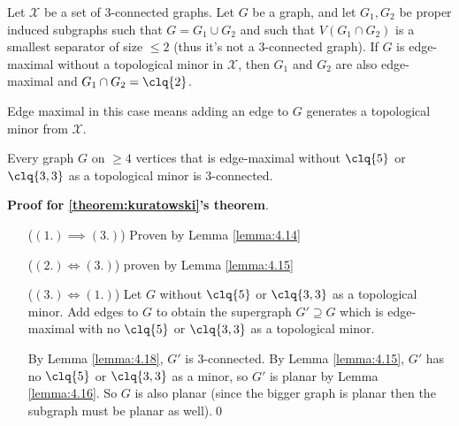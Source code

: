 \begin{customlemma}{4.17}
\label{lemma:4.17}
    Let $\mathcal{X}$ be a set of $3$-connected graphs. Let $G$ be a graph, and let $G_1, G_2$ be proper induced subgraphs such that $G = G_1 \cup G_2$ and such that $V(G_1 \cap G_2)$ is a smallest separator of size $\leq 2$ (thus it's not a $3$-connected graph). If $G$ is edge-maximal without a topological minor in $\mathcal{X}$, then $G_1$ and $G_2$ are also edge-maximal and $G_1 \cap G_2 = \clq{2}$.
\end{customlemma}
Edge maximal in this case means adding an edge to $G$ generates a topological minor from $\mathcal{X}$.
\begin{customlemma}{4.18}
\label{lemma:4.18}
    Every graph $G$ on $\geq 4$ vertices that is edge-maximal without $\clq{5}$ or $\clq{3, 3}$ as a topological minor is $3$-connected.
\end{customlemma}
\begin{prf}
    \textbf{Proof for \ref{theorem:kuratowski}'s theorem}.

    \begin{itemize}
        \item[($(1.) \implies (3.)$)] Proven by Lemma \ref{lemma:4.14}
        \item[($(2.) \iff (3.)$)] proven by Lemma \ref{lemma:4.15}
        \item[($(3.) \iff (1.)$)] Let $G$ without $\clq{5}$ or $\clq{3, 3}$ as a topological minor. Add edges to $G$ to obtain the supergraph $G' \supseteq G$ which is edge-maximal with no $\clq{5}$ or $\clq{3, 3}$ as a topological minor.
        
        By Lemma \ref{lemma:4.18}, $G'$ is $3$-connected. By Lemma \ref{lemma:4.15}, $G'$ has no $\clq{5}$ or $\clq{3, 3}$ as a minor, so $G'$ is planar by Lemma \ref{lemma:4.16}. So $G$ is also planar (since the bigger graph is planar then the subgraph must be planar as well).\qed
    \end{itemize}
\end{prf}